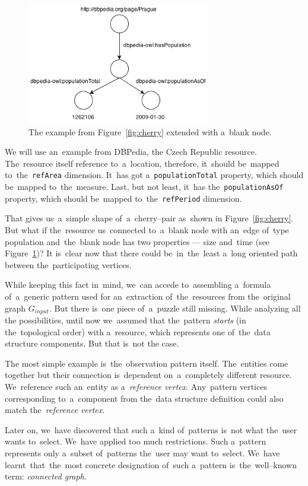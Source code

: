 \begin{figure}
	\centering
	\includegraphics[width=80mm]{images/cherry_blank.png}
	\caption{The example from Figure~\ref{fig:cherry} extended with a~blank node.}
	\label{fig:cherry-blank}
\end{figure}

We will use an~example from DBPedia, 
the Czech Republic resource. The~resource itself reference to~a~location, 
therefore, it~should be~mapped to~the~\verb|refArea| dimension. It~has got a~\verb|populationTotal| property, which should be~mapped to~the~measure. Last, but not 
least, it~has the~\verb|populationAsOf| property, which should be~mapped to~the~\verb|refPeriod| dimension.

That gives us~a~simple shape of~a~cherry--pair as~shown in
Figure~\ref{fig:cherry}. But what 
if the~resource us~connected to~a~blank node with an~edge of~type 
population and~the~blank node has two properties --- size and~time
(see Figure~\ref{fig:cherry-blank})?
It is~clear now that there could be~in~the~least a~long oriented path between the~participating 
vertices.

While keeping this fact in~mind, we~can accede to~assembling a~formula of~a~generic pattern used for an~extraction of~the~resources from the~original graph $G_{input}$. But 
there is~one piece of~a~puzzle still missing. While analyzing all the
possibilities, until now we~assumed that the~pattern \emph{starts} (in the~topological order)
with a~resource, which represents one of~the~data structure components. But that is~not  
the case.

The most simple example is~the~observation pattern itself. The~entities come together but their connection is~dependent on~a~completely 
different resource. We~reference such an~entity
as a~\emph{reference vertex}. Any~pattern vertices corresponding to~a~component from the~data structure definition could also match the~\emph{reference vertex}.

Later on, we~have discovered that such a~kind of~patterns is~not what the~user 
wants to~select. We~have applied too much restrictions. Such a~pattern
represents only a~subset of~patterns the~user may want to~select. We~have learnt~that~the~most concrete designation of~such a~pattern is~the~well--known term:
\emph{connected graph}.

